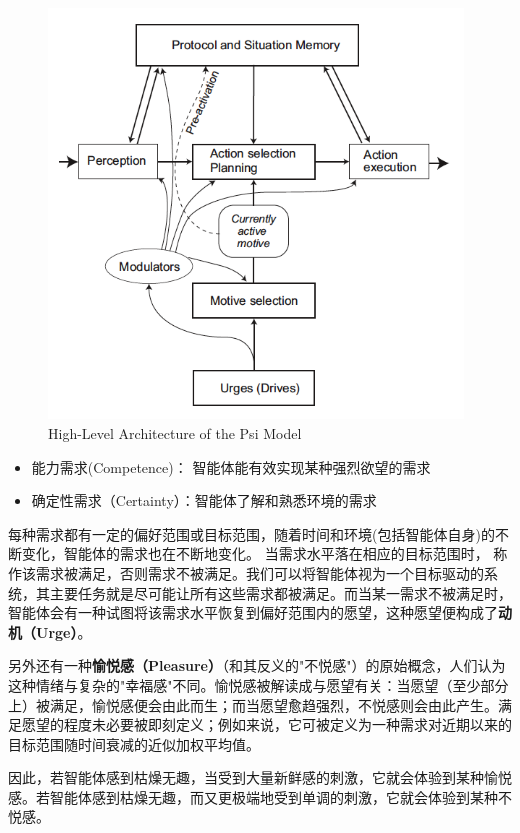 \begin{figure}[htb]
\centering
\includegraphics[width=11cm]{figures/Psi.png}
\caption{High-Level Architecture of the Psi Model}
\label{fig:Psi}
\end{figure}

\begin{itemize}
\item 能力需求(Competence)：  智能体能有效实现某种强烈欲望的需求
\item 确定性需求（Certainty）：智能体了解和熟悉环境的需求 
\end{itemize}

每种需求都有一定的偏好范围或目标范围，随着时间和环境(包括智能体自身)的不断变化，智能体的需求也在不断地变化。 当需求水平落在相应的目标范围时，
称作该需求被满足，否则需求不被满足。我们可以将智能体视为一个目标驱动的系统，其主要任务就是尽可能让所有这些需求都被满足。而当某一需求不被满足时，智能体会有一种试图将该需求水平恢复到偏好范围内的愿望，这种愿望便构成了{\bf 动机（Urge）}。


另外还有一种{\bf 愉悦感（Pleasure）}（和其反义的"不悦感"）的原始概念，人们认为这种情绪与复杂的"幸福感"不同。愉悦感被解读成与愿望有关：当愿望（至少部分上）被满足，愉悦感便会由此而生；而当愿望愈趋强烈，不悦感则会由此产生。满足愿望的程度未必要被即刻定义；例如来说，它可被定义为一种需求对近期以来的目标范围随时间衰减的近似加权平均值。

因此，若智能体感到枯燥无趣，当受到大量新鲜感的刺激，它就会体验到某种愉悦感。若智能体感到枯燥无趣，而又更极端地受到单调的刺激，它就会体验到某种不悦感。

